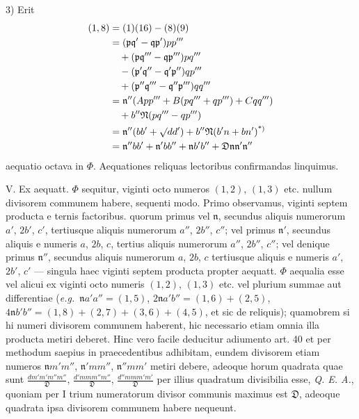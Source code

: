 3) Erit
\[
\begin{aligned}
(1,8)&=(1)(16)-(8)(9)\\
&=(\mathfrak{p}\mathfrak{q}'-\mathfrak{q}\mathfrak{p}')pp'''\\&\quad+(\mathfrak{p}\mathfrak{q}'''-\mathfrak{q}\mathfrak{p}''')pq'''\\&\quad-(\mathfrak{p}'\mathfrak{q}''-\mathfrak{q}'\mathfrak{p}'')qp'''\\&\quad+(\mathfrak{p}''\mathfrak{q}'''-\mathfrak{q}''\mathfrak{p}''')qq'''\\
&=\mathfrak{n}''(App'''+B(pq'''+qp''')+Cqq''')\\&\quad+b''\mathfrak{N}(pq'''-qp''')\\
&=\mathfrak{n}''(bb'+\surd dd')+b''\mathfrak{N}(b'n+bn')\text{\textsuperscript{*)}}\\
&=\mathfrak{n}''bb'+\mathfrak{n}'bb''+\mathfrak{n}b'b''+\mathfrak{D}\mathfrak{n}\mathfrak{n}'\mathfrak{n}''
\end{aligned}
\]
aequatio octava in $\Phi$. Aequationes reliquas lectoribus confirmandas linquimus.

V. Ex aequatt. $\Phi$ sequitur, viginti octo numeros $(1,2)$, $(1,3)$ etc. nullum divisorem communem habere, sequenti modo. Primo observamus, viginti septem producta e ternis factoribus. quorum primus vel $\mathfrak{n}$, secundus aliquis numerorum $a'$, $2b'$, $c'$, tertiusque aliquis numerorum $a''$, $2b''$, $c''$; vel primus $\mathfrak{n}'$, secundus aliquis e numeris $a$, $2b$, $c$, tertius aliquis numerorum $a''$, $2b''$, $c''$; vel denique primus $\mathfrak{n}''$, secundus aliquis numerorum $a$, $2b$, $c$ tertiusque aliquis e numeris $a'$, $2b'$, $c'$ --- singula haec viginti septem producta propter aequatt. $\Phi$ aequalia esse vel alicui ex viginti octo numeris $(1,2)$, $(1,3)$ etc. vel plurium summae aut differentiae (\textit{e.g.}\ $\mathfrak{n}a'a''=(1,5)$, $2\mathfrak{n}a'b''=(1,6)+(2,5)$, $4\mathfrak{n}b'b''=(1,8)+(2,7)+(3,6)+(4,5)$, et sic de reliquis); quamobrem si hi numeri divisorem communem haberent, hic necessario etiam omnia illa producta metiri deberet. Hinc vero facile deducitur adiumento art. 40 et per methodum saepius in praecedentibus adhibitam, eundem divisorem etiam numeros $\mathfrak{n}m'm''$, $\mathfrak{n}'mm''$, $\mathfrak{n}''mm'$ metiri debere, adeoque horum
quadrata quae sunt $\frac{dm'm'm''m''}{\mathfrak{D}}$, $\frac{d'mmm''m''}{\mathfrak{D}}$, $\frac{d''mmm'm'}{\mathfrak{D}}$ per illius quadratum divisibilia esse, \textit{Q. E. A.}, quoniam per I trium numeratorum divisor communis maximus est $\mathfrak{D}$, adeoque quadrata ipsa divisorem communem habere nequeunt.

